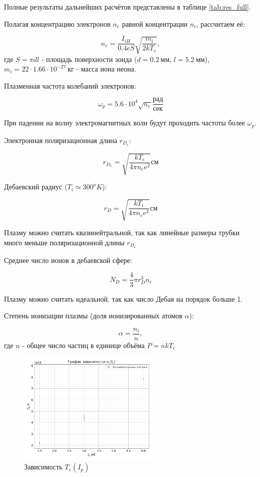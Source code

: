 \documentclass[a4paper, 12pt]{article}
\begin{document}
            Полные результаты дальнейших расчётов представлены в таблице \ref{tab:res_full}.

            Полагая концентрацию электронов $n_e$ равной концентрации $n_i$, рассчитаем её:

            $$
                n_e = \frac{I_{iH}}{0.4 e S} \sqrt{\frac{m_i}{2kT_e}},
            $$
            где $S = \pi d l$ - площадь поверхности зонда ($d = 0.2~мм$, $l = 5.2~мм$), $m_i = 22 \cdot 1.66 \cdot 10^{-27}~кг$ - масса иона неона.

            Плазменная частота колебаний электронов:

            $$
                \omega_p = 5.6 \cdot 10^4 \sqrt{n_e} \frac{рад}{сек}
            $$

            При падении на волну электромагнитных волн будут проходить частоты более $\omega_p$.

            Электронная поляризационная длина $r_{D_e}$:

            $$
                r_{D_e} = \sqrt{\frac{kT_e}{4 \pi n_e e^2}} см
            $$

            Дебаевский радиус ($T_i \simeq 300^oK$):

            $$
                r_D = \sqrt{\frac{kT_i}{4 \pi n_e e^2}} см
            $$

            Плазму можно считать квазинейтральной, так как линейные размеры трубки много меньше поляризационной длины $r_{D_e}$

            Среднее число ионов в дебаевской сфере:

            $$
                N_D = \frac{4}{3} \pi r_D^3 n_i
            $$

            Плазму можно считать идеальной, так как число Дебая на порядок больше 1.

            Степень ионизации плазмы (доля ионизированных атомов $\alpha$):

            $$
                \alpha = \frac{n_i}{n},
            $$
            где $n$ - общее число частиц в единице объёма $P = nkT_i$


            \begin{figure}[!ht]
                \centering
                \includegraphics[width=0.6\textwidth]{img/T_e_I_p.png}
                \caption{Зависимость $T_e(I_p)$}
                \label{plot:T_e_I_p}
            \end{figure}
\end{document}

